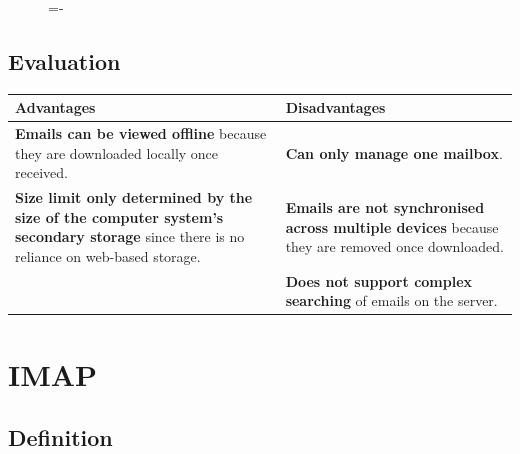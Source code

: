 \documentclass[a4paper]{systems-software}
\begin{document}
\begin{figure}[H]
	\lineskip=-\fboxrule
\end{figure}


\subsection*{Evaluation}

\begin{longtabu} to \textwidth {| X[1,l] | X[1,l] |}
	\hline
	\textbf{Advantages} & \textbf{Disadvantages}
	\\ \hline
	\textbf{Emails can be viewed offline} because they are downloaded locally once received. &
	\textbf{Can only manage one mailbox}.
	\\ \hline
	\textbf{Size limit only determined by the size of the computer system’s secondary storage} since there is no reliance on web-based storage. & \textbf{Emails are not synchronised across multiple devices} because they are removed once downloaded.
	\\ \hline
	& \textbf{Does not support complex searching} of emails on the server.
	\\ \hline
\end{longtabu}


\section*{IMAP}

\subsection*{Definition}
\end{document}
